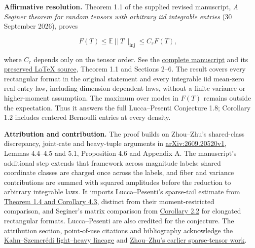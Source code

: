 \documentclass[11pt,a4paper]{article}
\makeatletter
\renewcommand{\subsection}{\Needspace{4\baselineskip}\@startsection{subsection}{2}{0pt}{9pt plus 1pt minus 1pt}{3pt}{\sffamily\bfseries\normalsize\color{ink}}}
\makeatother
\begin{document}
\newpage
\subsection{Resolution --- 2026-10-01}\label{resolution-2026-10-01}

\textbf{Affirmative resolution.} Theorem 1.1 of the supplied revised
manuscript, \emph{A Seginer theorem for random tensors with arbitrary
iid integrable entries} (30 September 2026), proves

\[F(T)\leq\mathbb E\|T\|_{\mathrm{inj}}\leq C_rF(T),\]

where \(C_r\) depends only on the tensor order. See the
\href{https://github.com/ajt60gaibb/OpenProblemsInNLA/blob/main/references/haidary-resolutions-2026-09-30/TR-21-Seginer-comparison-revised.pdf}{complete
manuscript} and its
\href{https://github.com/ajt60gaibb/OpenProblemsInNLA/blob/main/references/haidary-resolutions-2026-09-30/TR-21-Seginer-comparison-revised.tex}{preserved
LaTeX source}, Theorem 1.1 and Sections 2--6. The result covers every
rectangular format in the original statement and every integrable iid
mean-zero real entry law, including dimension-dependent laws, without a
finite-variance or higher-moment assumption. The maximum over modes in
\(F(T)\) remains outside the expectation. Thus it answers the full
Lucca--Pesenti Conjecture 1.8; Corollary 1.2 includes centered Bernoulli
entries at every density.

\textbf{Attribution and contribution.} The proof builds on Zhou--Zhu's
shared-class discrepancy, joint-rate and heavy-tuple arguments in
\href{https://arxiv.org/abs/2609.20520v1}{arXiv:2609.20520v1}, Lemmas
4.4--4.5 and 5.1, Proposition 4.6 and Appendix A. The manuscript's
additional step extends that framework across magnitude labels: shared
coordinate classes are charged once across the labels, and fiber and
variance contributions are summed with squared amplitudes before the
reduction to arbitrary integrable laws. It imports Lucca--Pesenti's
sparse-tail estimate from
\href{https://arxiv.org/html/2607.07308v1}{Theorem 1.4 and Corollary
4.3}, distinct from their moment-restricted comparison, and Seginer's
matrix comparison from
\href{https://doi.org/10.1017/S096354830000420X}{Corollary 2.2} for
elongated rectangular formats. Lucca--Pesenti are also credited for the
conjecture. The attribution section, point-of-use citations and
bibliography acknowledge the
\href{https://doi.org/10.1145/73007.73063}{Kahn--Szemerédi light--heavy
lineage} and \href{https://doi.org/10.1214/21-EJS1838}{Zhou--Zhu's
earlier sparse-tensor work}.
\end{document}
